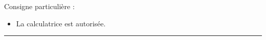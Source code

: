 

\SetDate[10/10/2025]


\pagestyle{fancy}
\fancyhead[R]{\today}

Consigne particulière : 
\begin{itemize}[label=$\bullet$]
	\item 
	La calculatrice est {autorisée}.
\end{itemize}

\hrule





\newpage
{}
\shipoutAnswer


